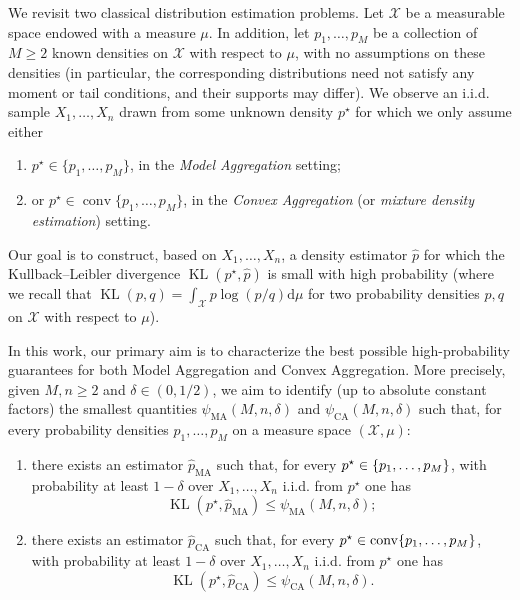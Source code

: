 \documentclass[11pt]{article}
\makeatletter
\renewcommand{\leq}{\leqslant}
\renewcommand{\geq}{\geqslant}
\newcommand{\wh}{\widehat}
\newcommand{\di}{\mathrm{d}}
\newcommand{\M}{M}
\newcommand{\X}{\mathcal{X}}
\newcommand{\conv}{\mathop{\mathrm{conv}}}
\newcommand{\iid}{i.i.d.\@\xspace}
\newcommand{\kl}{\operatorname{KL}}
\newcommand{\kll}[2]{\kl ({#1}, {#2})}
\theoremstyle{definition}
\theoremstyle{remark}
\DeclarePairedDelimiter{\set}{\{}{\}}
\makeatother
\begin{document}
We revisit two classical distribution estimation problems.
Let $\X$ be a measurable space endowed with a measure $\mu$.
In addition, let $p_1,\ldots,p_\M$ be a collection of $\M \geq 2$ known densities on $\X$ with respect to $\mu$, with no assumptions on these densities (in particular, the corresponding distributions need not satisfy any moment or tail conditions, and their supports may differ).
We 
observe an \iid sample $X_1,\ldots,X_n$ drawn from some unknown density $p^\star$ for which we only assume either
\begin{enumerate}
\item $p^\star \in \{p_1,\ldots,p_\M\}$, in the \emph{Model Aggregation} setting;
\item or $p^\star \in \operatorname{conv}\{p_1,\ldots,p_\M\}$, in the \emph{Convex Aggregation} (or \emph{mixture density estimation}) setting.
\end{enumerate}
Our goal is to construct, based on $X_1,\ldots,X_n$, a density estimator $\widehat{p}$ for which the Kullback--Leibler divergence $\kl(p^\star,\widehat{p})$ is small with high probability (where we recall that $\kll{p}{q} = \int_\X p \log (p/q) \di \mu$ for two probability densities $p, q$ on $\X$ with respect to $\mu$).

In this work, our primary aim is to characterize the best possible high-probability guarantees for both Model Aggregation and Convex Aggregation.
More precisely, given $\M, n \geq 2$ and $\delta \in (0, 1/2)$, we aim to identify (up to absolute constant factors) the smallest quantities $\psi_{\mathrm{MA}} (M, n, \delta)$ and $\psi_{\mathrm{CA}} (M, n, \delta)$ such that, for every probability densities $p_1, \dots, p_\M$ on a measure space $(\X, \mu)$:
\begin{enumerate}
\item there exists an estimator $\wh p_{\mathrm{MA}}$ such that, for every $p^\star \in \set{p_1, \dots, p_\M}$, with probability at least $1-\delta$ over $X_1, \dots, X_n$ \iid from $p^\star$ one has
  \begin{equation}
    \label{eq:def-optrate-ma}
    \kll{p^\star}{\wh p_{\mathrm{MA}}}
    \leq \psi_{\mathrm{MA}} (M, n, \delta)
    ;
  \end{equation}
\item there exists an estimator $\wh p_{\mathrm{CA}}$ such that, for every $p^\star \in \conv \set{p_1, \dots, p_\M}$, with probability at least $1-\delta$ over $X_1, \dots, X_n$ \iid from $p^\star$ one has
  \begin{equation}
    \label{eq:def-optrate-ca}
    \kll{p^\star}{\wh p_{\mathrm{CA}}}
    \leq \psi_{\mathrm{CA}} (M, n, \delta)
    .
  \end{equation}
\end{enumerate}
\end{document}
